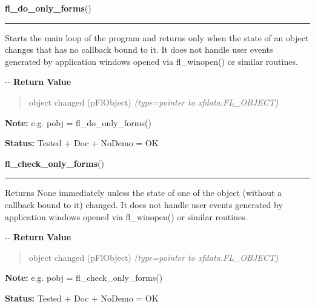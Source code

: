 \hspace{.8\funcindent}\begin{boxedminipage}{\funcwidth}

    \raggedright \textbf{fl\_do\_only\_forms}()

    \vspace{-1.5ex}

    \rule{\textwidth}{0.5\fboxrule}
\setlength{\parskip}{2ex}

Starts the main loop of the program and returns only when the state of
an object changes that has no callback bound to it. It does not handle
user events generated by application windows opened via fl\_winopen() or
similar routines.

-{}-
\setlength{\parskip}{1ex}
      \textbf{Return Value}
    \vspace{-1ex}

      \begin{quote}

object changed (pFlObject)
      {\it (type=pointer to xfdata.FL\_OBJECT)}

      \end{quote}

\textbf{Note:} 
e.g. pobj = fl\_do\_only\_forms()


\textbf{Status:} 
Tested + Doc + NoDemo = OK


    \end{boxedminipage}

    \label{xformslib:flbasic:fl_check_only_forms}

    \vspace{0.5ex}

\hspace{.8\funcindent}\begin{boxedminipage}{\funcwidth}

    \raggedright \textbf{fl\_check\_only\_forms}()

    \vspace{-1.5ex}

    \rule{\textwidth}{0.5\fboxrule}
\setlength{\parskip}{2ex}

Returns None immediately unless the state of one of the object (without
a callback bound to it) changed. It does not handle user events generated
by application windows opened via fl\_winopen() or similar routines.

-{}-
\setlength{\parskip}{1ex}
      \textbf{Return Value}
    \vspace{-1ex}

      \begin{quote}

object changed (pFlObject)
      {\it (type=pointer to xfdata.FL\_OBJECT)}

      \end{quote}

\textbf{Note:} 
e.g. pobj = fl\_check\_only\_forms()


\textbf{Status:} 
Tested + Doc + NoDemo = OK


    \end{boxedminipage}

